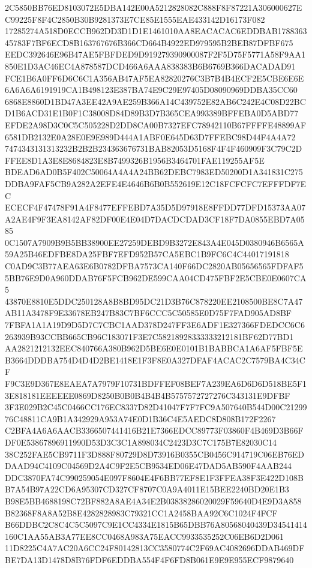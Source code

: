 \documentclass[UTF8,fontset=fandol,zihao=-4,a4paper]{ctexart}
\begin{document}
{{2C5850BB76ED8103072E5DBA142E00A5212828082C888F8F87221A306000627EC99225F8F4C2850B30B9281373E7CE85E1555EAE433142D16173F082
17285274A518D0ECCB962DD3D1D1E1461010AA8EACACAC6EDDBAB178836345783F7BF6ECD8B163767676B366CD664B4922ED979595B2BEB87DFBF675
EEDC392646E96B47AE5FBFDED9D919279390900087F2F5D75F5771A58F9AA1850E1D3AC46EC4A878587DCD466A6AAA838383B6B6769B366DACADAD91
FCE1B6A0FF6D6C6C1A356AB47AF5EA82820276C3B7B4B4ECF2E5CBE6E6E6A6A6A6191919CA1B498123E387BA74E9C29E97405D08090969DDBA35CC60
6868E8860D1BD47A3EE42A9AE259B366A14C439752E82AB6C242E4C08D22BCD1B6ACD31E1B0F1C38008D84D89B3D7B365CEA993389BFFEBA0D5ABD77
EFDE2A98D3C0C5C505228D2DD8CA00B7327EFC78942110B67FFFFE48899AF6581DB2132E0A28E0E9E989D444A1ABF0E645D63D7FFEBC98D44F4A4A72
7474343131313232B2B2B234363676731BAB82053D5168F4F4F460909F3C79C2DFFEE8D1A3E8E8684823E8B7499326B1956B3464701FAE119255AF5E
BDEAD6AD0B5F402C50064A4A4A24BB62DEBC7983ED50200D1A341831C275DDBA9FAF5CB9A282A2EFE4E4646B6B0B552619E12C18FCFCFC7EFFFDF7EC
ECECF4F47478F91A4F8477EFFEBD7A35D5D97918E8FFDD77DFD15373AA07A2AE4F9F3EA8142AF82DF00E4E04D7DACDCDAD3CF18F7DA0855EBD7A0585
0C1507A7909B9B5BB38900EE27259DEBD9B3272E843A4E045D0380946B6565A59A25B46EDFBE8DA25FBF7EFD952B57CA5EBC1B9FC6C4C44017191818
C0AD9C3B77AEA63E6B0782DFBA7573CA140F66DC2820AB05656565FDFAF55BB76E9D0A960DDAB76F5FCB962DE599CAA04CD475FBF2E5CBE0E0607CA5
43870E8810E5DDC250128A8B8BD95DC21D3B76C878220EE2108500BE8C7A47AB11A3478F9E33678EB247B83C7BF6CCC5C50585E0D75F7FAD905AD8BF
7FBFA1A1A19D9D5D7C7CBC1AAD378D247FF3E6ADF1E327366FDEDCC6C6263939B93CCBB665CB96C183071F3E7C58218928333333212181BF62D77BD1
AA2821212132EEC840766A380B962D5BE6E0E0101B1BABBCA1A6AF5FBF5EB3664DDDBA754D4D4D2BE1418E1F3F8E0A327DFAF4ACAC2C7579BA4C34CF
F9C3E9D367E8EAEA7A7979F10731BDFFEF08BEF7A239EA6D6D6D518BE5F13E818181EEEEEE0869D8250B0B0B4B4B4B5757572727276C343131E9DFBF
3F3E029B2C45C0466CC176EC8337D82D41047F7F7FC9A507640B544D00C2129976C48811CA9B1A342929A953A74E0D1B36C4E5AEDC8D808B172F2267
C2BFA4A6A6AACB3366507441416B21E7366EDCC89773F03860F4B469D3B66FDF0E53867896911990D53D3C3C1A898034C2423D3C7C175B7E82030C14
38C252FAE5CB9711F3D888F80729D8D73916B0355CB0456C914719C06EB76EDDAAD94C4109C04569D2A4C9F2E5CB9534ED06E47DAD5AB590F4AAB244
DDC3870FA74C990259054E097F8604E4F6BB77EF8E1F3FFEA38F3E422D108BB7A54B97A22CD6A95307CD327CF8707C0A9A4011E15BEE2240BD20E1B3
B98E5BB4688198C72BF882A8AE4A34E2B03838286020029F59640D4E9D3A858B82368F8A8A52B8E4282828983C79321CC1A2458BAA92C6C1024F4FCF
B66DDBC2C8C4C5C5097C9E1CC4334E1815B65DBB76A80568040439D34541414160C1AA55AB3A77EE8CC0468A983A75EACC9933535252C06EB6D2D061
11D8225C4A7AC20A6CC24F80142813CC3580774C2F69AC4082696DDAB469DFBE7DA13D1478D8B76FDF6EDDBA554F4F6FD8B061E9E9E955ECF9879640
}}
\end{document}

